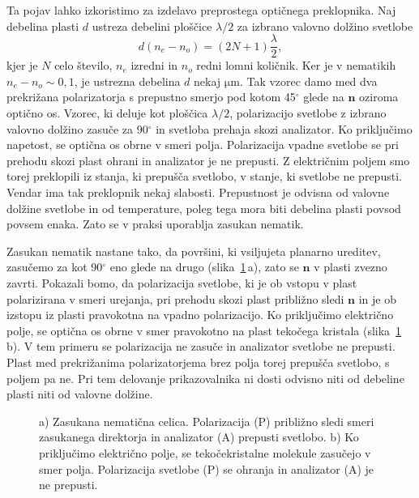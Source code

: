 Ta pojav lahko izkoristimo za izdelavo preprostega optičnega preklopnika. 
Naj debelina plasti $d$ ustreza debelini ploščice $\lambda/2$ 
za izbrano valovno dolžino svetlobe 
\begin{equation}
d(n_{e}-n_{o})=(2N+1)\frac{\lambda}{2},
\label{7.57}
\end{equation}
kjer je $N$ celo število, $n_e$ izredni in $n_o$ redni 
lomni količnik. Ker je v nematikih $n_{e}-n_{o}\sim0,1$, 
je ustrezna debelina $d$ nekaj $\si{\micro\metre}$. Tak vzorec damo med dva prekrižana 
polarizatorja s prepustno smerjo pod kotom 45$^\circ$ glede na $\mathbf{n}$
oziroma optično os. Vzorec, ki deluje kot ploščica $\lambda/2$, 
polarizacijo svetlobe z izbrano valovno dolžino zasuče za 90$^\circ$ in 
svetloba prehaja skozi analizator. Ko
priključimo napetost, se optična os obrne v smeri polja. Polarizacija vpadne 
svetlobe se pri prehodu skozi plast ohrani in 
analizator je ne prepusti. Z električnim poljem smo torej preklopili iz
stanja, ki prepušča svetlobo, v stanje, ki svetlobe ne prepusti.
Vendar ima tak preklopnik nekaj slabosti. Prepustnost je odvisna
od valovne dolžine svetlobe in od temperature, poleg tega mora biti debelina 
plasti povsod povsem enaka. Zato se v praksi uporablja zasukan nematik. 

Zasukan  nematik nastane tako, da površini, ki vsiljujeta planarno ureditev,
zasučemo za kot 90$^\circ$ eno glede na drugo (slika~\ref{LCD1}\,a), zato se $\mathbf{n}$ 
v plasti zvezno zavrti.
Pokazali bomo, da polarizacija svetlobe, ki je ob vstopu 
v plast polarizirana v smeri urejanja, pri prehodu skozi plast približno
sledi $\mathbf{n}$ in je ob izstopu iz plasti pravokotna
na vpadno polarizacijo. Ko priključimo električno polje, se optična os 
obrne v smer pravokotno na plast tekočega kristala (slika~\ref{LCD1}\,b). V tem primeru 
se polarizacija ne zasuče in analizator svetlobe ne prepusti. Plast med prekrižanima
polarizatorjema brez polja torej prepušča svetlobo, s poljem pa ne. Pri tem
delovanje prikazovalnika ni dosti odvisno niti od debeline plasti niti
od valovne dolžine. 
\begin{figure}[h!]
\centering
\def\svgwidth{105truemm} 

\caption{a) Zasukana nematična celica. 
Polarizacija (P) približno sledi smeri zasukanega direktorja in analizator (A) 
prepusti svetlobo. b) Ko priključimo električno polje, se tekočekristalne molekule
zasučejo v smer polja. Polarizacija svetlobe (P) se ohranja in analizator (A) 
je ne prepusti. }
\label{LCD1}
\end{figure}

